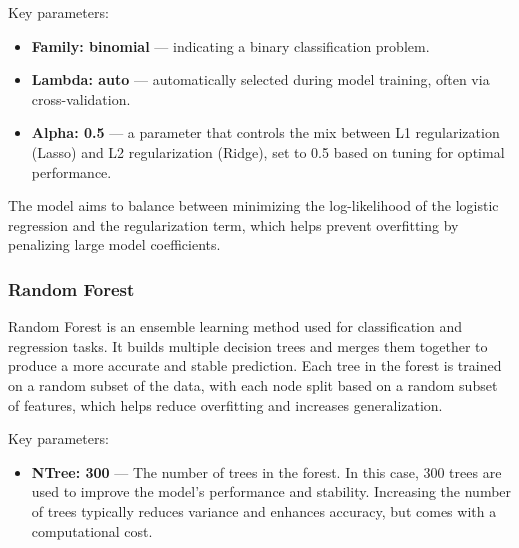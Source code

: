 Key parameters:

\begin{itemize}
    \item \textbf{Family: binomial} — indicating a binary classification problem.
    \item \textbf{Lambda: auto} — automatically selected during model training, often via cross-validation.
    \item \textbf{Alpha: 0.5} — a parameter that controls the mix between L1 regularization (Lasso) and L2 regularization (Ridge), set to 0.5 based on tuning for optimal performance.
\end{itemize}

The model aims to balance between minimizing the log-likelihood of the logistic regression and the regularization term, which helps prevent overfitting by penalizing large model coefficients.



\subsubsection{Random Forest}

Random Forest is an ensemble learning method used for classification and regression tasks. It builds multiple decision trees and merges them together to produce a more accurate and stable prediction. Each tree in the forest is trained on a random subset of the data, with each node split based on a random subset of features, which helps reduce overfitting and increases generalization.

Key parameters:

\begin{itemize}
    \item \textbf{NTree: 300} — The number of trees in the forest. In this case, 300 trees are used to improve the model's performance and stability. Increasing the number of trees typically reduces variance and enhances accuracy, but comes with a computational cost.
\end{itemize}




